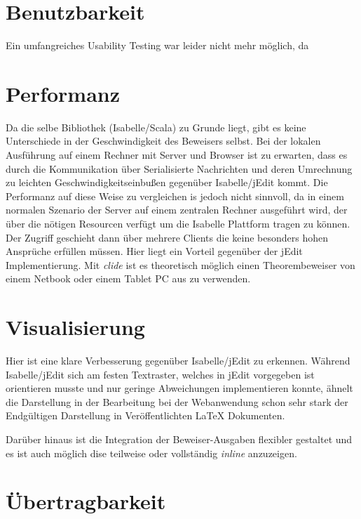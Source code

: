 \section{Benutzbarkeit}

Ein umfangreiches Usability Testing war leider nicht mehr möglich, da 

\section{Performanz}

Da die selbe Bibliothek (Isabelle/Scala) zu Grunde liegt, gibt es keine Unterschiede in der
Geschwindigkeit des Beweisers selbst. Bei der lokalen Ausführung auf einem Rechner mit Server und
Browser ist zu erwarten, dass es durch die Kommunikation über Serialisierte Nachrichten und deren
Umrechnung zu leichten Geschwindigkeitseinbußen gegenüber Isabelle/jEdit kommt. Die Performanz auf
diese Weise zu vergleichen is jedoch nicht sinnvoll, da in einem normalen Szenario der Server auf
einem zentralen Rechner ausgeführt wird, der über die nötigen Resourcen verfügt um die Isabelle
Plattform tragen zu können. Der Zugriff geschieht dann über mehrere Clients die keine besonders
hohen Ansprüche erfüllen müssen. Hier liegt ein Vorteil gegenüber der jEdit Implementierung.
Mit \textit{clide} ist es theoretisch möglich einen Theorembeweiser von einem Netbook oder einem
Tablet PC aus zu verwenden.

\section{Visualisierung}

Hier ist eine klare Verbesserung gegenüber Isabelle/jEdit zu erkennen. Während Isabelle/jEdit sich
am festen Textraster, welches in jEdit vorgegeben ist orientieren musste und nur geringe
Abweichungen implementieren konnte, ähnelt die Darstellung in der Bearbeitung bei der Webanwendung
schon sehr stark der Endgültigen Darstellung in Veröffentlichten LaTeX Dokumenten.

Darüber hinaus ist die Integration der Beweiser-Ausgaben flexibler gestaltet und es ist auch möglich
dise teilweise oder vollständig \textit{inline} anzuzeigen.

\section{Übertragbarkeit}

